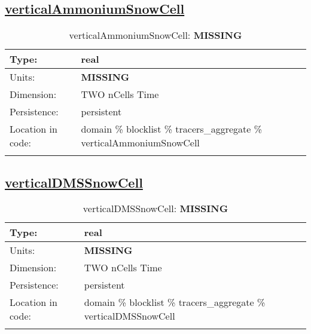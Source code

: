 \subsection[verticalAmmoniumSnowCell]{\hyperref[sec:var_tab_tracers_aggregate]{verticalAmmoniumSnowCell}}
\label{subsec:var_sec_tracers_aggregate_verticalAmmoniumSnowCell}
\begin{center}
\begin{longtable}{| p{2.0in} | p{4.0in} |}
        \hline 
        Type: & real \\
        \hline 
        Units: & {\bf \color{red} MISSING} \\
        \hline 
        Dimension: & TWO nCells Time \\
        \hline 
        Persistence: & persistent \\
        \hline 
         Location in code: & domain \% blocklist \% tracers\_aggregate \% verticalAmmoniumSnowCell \\
         \hline 
    \caption{verticalAmmoniumSnowCell: {\bf \color{red} MISSING}}
\end{longtable}
\end{center}
\subsection[verticalDMSSnowCell]{\hyperref[sec:var_tab_tracers_aggregate]{verticalDMSSnowCell}}
\label{subsec:var_sec_tracers_aggregate_verticalDMSSnowCell}
\begin{center}
\begin{longtable}{| p{2.0in} | p{4.0in} |}
        \hline 
        Type: & real \\
        \hline 
        Units: & {\bf \color{red} MISSING} \\
        \hline 
        Dimension: & TWO nCells Time \\
        \hline 
        Persistence: & persistent \\
        \hline 
         Location in code: & domain \% blocklist \% tracers\_aggregate \% verticalDMSSnowCell \\
         \hline 
    \caption{verticalDMSSnowCell: {\bf \color{red} MISSING}}
\end{longtable}
\end{center}
